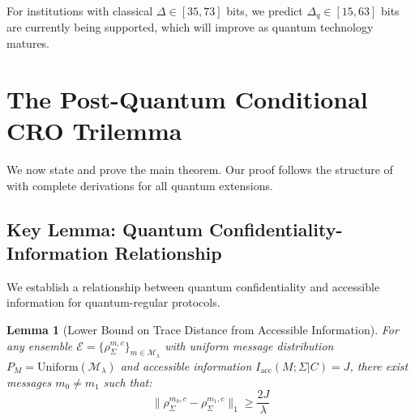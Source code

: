 \documentclass{ieeeaccess}
\newtheorem{lemma}{Lemma}[section]
\begin{document}
For institutions with classical $\Delta \in [35, 73]$ bits, we predict $\Delta_q \in [15, 63]$ bits are currently being supported, which will improve as quantum technology matures.


\section{The Post-Quantum Conditional CRO Trilemma}\label{sec:cro_trilemma}

We now state and prove the main theorem. Our proof follows the structure of \cite[Section V]{Minka2026CRO} with complete derivations for all quantum extensions.

\subsection{Key Lemma: Quantum Confidentiality-Information Relationship}

We establish a relationship between quantum confidentiality and accessible information for quantum-regular protocols.
\begin{lemma}[Lower Bound on Trace Distance from Accessible Information]
\label{lem:trace_lower}
For any ensemble $\mathcal{E} = \{\rho_\Sigma^{m,c}\}_{m \in \mathcal{M}_\lambda}$ 
with uniform message distribution $P_M = \mathrm{Uniform}(\mathcal{M}_\lambda)$ 
and accessible information $I_{\mathrm{acc}}(M;\Sigma|C) = J$, there exist 
messages $m_0 \neq m_1$ such that:
\begin{equation}
    \|\rho_\Sigma^{m_0,c} - \rho_\Sigma^{m_1,c}\|_1 \geq \frac{2J}{\lambda}
\end{equation}
\end{lemma}
\end{document}
